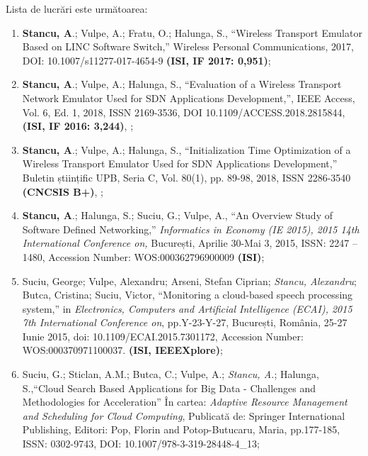 Lista de lucrări este următoarea:
\begin{enumerate}
	\item \textbf{Stancu, A}.; Vulpe, A.; Fratu, O.; Halunga, S., ``Wireless Transport Emulator Based on LINC Software Switch,'' Wireless Personal Communications, 2017, DOI: 10.1007/s11277-017-4654-9 \textbf{(ISI, IF 2017: 0,951)}\label{item:wte_linc};
	
	\item \textbf{Stancu, A}.; Vulpe, A.; Halunga, S., ``Evaluation of a Wireless Transport Network Emulator Used for SDN Applications Development,'', IEEE Access, Vol. 6, Ed. 1, 2018, ISSN 2169-3536, DOI 10.1109/ACCESS.2018.2815844, \textbf{(ISI, IF 2016: 3,244)}, \label{item:wte_evaluation};
	
	\item \textbf{Stancu, A}.; Vulpe, A.; Halunga, S., ``Initialization Time Optimization of a Wireless Transport Emulator Used for SDN Applications Development,'' Buletin științific UPB, Seria C, Vol. 80(1), pp. 89-98, 2018, ISSN 2286-3540 \textbf{(CNCSIS B+)}, \label{item:wte_init_optimization};
	
	\item \textbf{Stancu, A}.; Halunga, S.; Suciu, G.; Vulpe, A., ``An Overview Study of Software Defined Networking,'' \textit{Informatics in Economy (IE 2015), 2015 14th International Conference on,} București, Aprilie 30-Mai 3, 2015, ISSN: 2247 – 1480, Accession Number: WOS:000362796900009 \textbf{(ISI)}\label{item:overview_sdn};
	
	\item Suciu, George; Vulpe, Alexandru; Arseni, Stefan Ciprian; \textit{Stancu, Alexandru}; Butca, Cristina; Suciu, Victor, ``Monitoring a cloud-based speech processing system,'' in \textit{Electronics, Computers and Artificial Intelligence (ECAI), 2015 7th International Conference on}, pp.Y-23-Y-27, București, România, 25-27 Iunie 2015, doi: 10.1109/ECAI.2015.7301172, Accession Number: WOS:000370971100037. \textbf{(ISI, IEEEXplore)};
	
	\item Suciu, G.; Sticlan, A.M.; Butca, C.; Vulpe, A.; \textit{Stancu, A.}; Halunga, S.,``Cloud Search Based Applications for Big Data - Challenges and Methodologies for Acceleration'' În cartea: \textit{Adaptive Resource Management and Scheduling for Cloud Computing}, Publicată de: Springer International Publishing, Editori: Pop, Florin and Potop-Butucaru, Maria, pp.177-185, ISSN: 0302-9743, DOI: 10.1007/978-3-319-28448-4\_13;
	

\end{enumerate}
